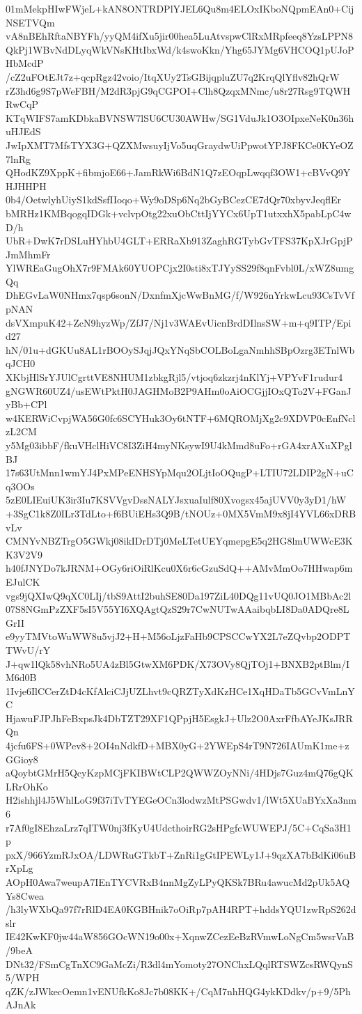 01mMekpHIwFWjeL+kAN8ONTRDPlYJEL6Qu8m4ELOxIKboNQpmEAn0+CijNSETVQm
vA8nBEhRftaNBYFh/yyQM4ifXu5jir00hea5LuAtvspwClRxMRpfeeq8YzsLPPN8
QkPj1WBvNdDLyqWkVNsKHtIbxWd/k4swoKkn/Yhg65JYMg6VHCOQ1pUJoPHbMcdP
/cZ2uFOtEJt7z+qcpRgz42voio/ItqXUy2TsGBijqpluZU7q2KrqQlYflv82hQrW
rZ3hd6g9S7pWeFBH/M2dR3pjG9qCGPOI+Clh8QzqxMNmc/u8r27Rsg9TQWHRwCqP
KTqWIFS7amKDbkaBVNSW7lSU6CU30AWHw/SG1VduJk1O3OIpxeNeK0n36huHJEdS
JwIpXMT7MfsTYX3G+QZXMwsuyIjVo5uqGraydwUiPpwotYPJ8FKCe0KYeOZ7lnRg
QHodKZ9XppK+fibmjoE66+JamRkWi6BdN1Q7zEOqpLwqqf3OW1+cBVvQ9YHJHHPH
0b4/OetwlyhUiyS1kdSsfIIoqo+Wy9oDSp6Nq2bGyBCezCE7dQr70xbyvJeqflEr
bMRHz1KMBqogqIDGk+vclvpOtg22xuObCttIjYYCx6UpT1utxxhX5pabLpC4wD/h
UbR+DwK7rDSLuHYhbU4GLT+ERRaXb913ZaghRGTybGvTFS37KpXJrGpjPJmMhmFr
YlWREaGugOhX7r9FMAk60YUOPCjx2I0sti8xTJYySS29f8qnFvbl0L/xWZ8umgQq
DhEGvLaW0NHmx7qsp6sonN/DxnfmXjcWwBnMG/f/W926nYrkwLcu93CsTvVfpNAN
dsVXmpuK42+ZcN9hyzWp/ZfJ7/Nj1v3WAEvUicnBrdDIlnsSW+m+q9ITP/Epid27
hN/01u+dGKUu8AL1rBOOySJqjJQxYNqSbCOLBoLgaNmhhSBpOzrg3ETnlWbqJCH0
XKbjHlSrYJUlCgrttVE8NHUM1zbkgRjl5/vtjoq6zkzrj4nKlYj+VPYvF1rudur4
gNGWR60UZ4/usEWtPktH0JAGHMoB2P9AHm0oAiOCGjjIOxQTo2V+FGanJyBb+CPl
w4KERWiCvpjWA56G0fc6SCYHuk3Oy6tNTF+6MQROMjXg2c9XDVP0cEnfNclzL2CM
y5Mg03ibbF/fkuVHclHiVC8I3ZiH4myNKsywI9U4kMmd8uFo+rGA4xrAXuXPglBJ
17s63UtMnn1wmYJ4PxMPeENHSYpMqu2OLjtIoOQugP+LTIU72LDIP2gN+uCq3OOs
5zE0LIEuiUK3ir3Iu7KSVVgvDssNALYJsxuaIulf80Xvogsx45ajUVV0y3yD1/hW
+3SgC1k8Z0ILr3TdLto+f6BUiEHs3Q9B/tNOUz+0MX5VmM9x8jI4YVL66xDRBvLv
CMNYvNBZTrgO5GWkj08ikIDrDTj0MeLTetUEYqmepgE5q2HG8lmUWWcE3KK3V2V9
h40fJNYDo7kJRNM+OGy6riOiRlKcu0X6r6cGzuSdQ++AMvMmOo7HHwap6mEJulCK
vgs9jQXIwQ9qXC0LIj/tbS9AttI2buhSE80Da197ZiL40DQg11vUQ0JO1MBbAc2l
07S8NGmPzZXF5sI5V55YI6XQAgtQzS29r7CwNUTwAAaibqbLI8Da0ADQre8LGrII
e9yyTMVtoWuWW8u5vjJ2+H+M56oLjzFaHb9CPSCCwYX2L7eZQvbp2ODPTTWvU/rY
J+qw1lQk58vhNRo5UA4zBl5GtwXM6PDK/X73OVy8QjTOj1+BNXB2ptBlm/IM6d0B
1Ivje6IlCCerZtD4cKfAlciCJjUZLhvt9cQRZTyXdKzHCe1XqHDaTb5GCvVmLnYC
HjawuFJPJhFeBxpsJk4DbTZT29XF1QPpjH5EsgkJ+Ulz2O0AxrFfbAYeJKsJRRQn
4jcfu6FS+0WPev8+2OI4nNdkfD+MBX0yG+2YWEpS4rT9N726IAUmK1me+zGGioy8
aQoybtGMrH5QcyKzpMCjFKIBWtCLP2QWWZOyNNi/4HDjs7Guz4mQ76gQKLRrOhKo
H2ishhjl4J5WhlLoG9f37iTvTYEGeOCn3lodwzMtPSGwdv1/lWt5XUaBYxXa3nm6
r7Af0gI8EhzaLrz7qITW0nj3fKyU4UdcthoirRG2sHPgfcWUWEPJ/5C+CqSa3H1p
pxX/966YzmRJxOA/LDWRuGTkbT+ZnRi1gGtIPEWLy1J+9qzXA7bBdKi06uBrXpLg
AOpH0Awa7weupA7IEnTYCVRxB4nnMgZyLPyQKSk7BRu4awucMd2pUk5AQYs8Cwea
/h3lyWXbQa97f7rRlD4EA0KGBHnik7oOiRp7pAH4RPT+hddsYQU1zwRpS262dslr
IE42KwKF0jw44aW856GOcWN19o00x+XqnwZCezEeBzRVmwLoNgCm5wsrVaB/9beA
DNt32/FSmCgTnXC9GaMcZi/R3dl4mYomoty27ONChxLQqlRTSWZcsRWQynS5/WPH
qZK/zJWkecOemn1vENUfkKo8Jc7b08KK+/CqM7nhHQG4ykKDdkv/p+9/5PhAJnAk
